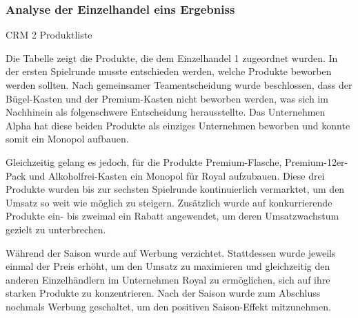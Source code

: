 \documentclass[a4paper,12pt]{article}
\begin{document}
\subsubsection{Analyse der Einzelhandel eins Ergebniss}
\begin{table}[H]
    \centering
    \caption{CRM 2 Produktliste}
    \label{tab:CRM 2 Produktliste}
\end{table}
Die Tabelle zeigt die Produkte, die dem Einzelhandel 1 zugeordnet wurden.
In der ersten Spielrunde musste entschieden werden, welche Produkte beworben werden sollten.
Nach gemeinsamer Teamentscheidung wurde beschlossen, dass der Bügel-Kasten und der Premium-Kasten nicht beworben werden,
was sich im Nachhinein als folgenschwere Entscheidung herausstellte.
Das Unternehmen Alpha hat diese beiden Produkte als einziges Unternehmen beworben und konnte somit ein Monopol aufbauen.

Gleichzeitig gelang es jedoch, für die Produkte Premium-Flasche,
Premium-12er-Pack und Alkoholfrei-Kasten ein Monopol für Royal aufzubauen.
Diese drei Produkte wurden bis zur sechsten Spielrunde kontinuierlich vermarktet,
um den Umsatz so weit wie möglich zu steigern.
Zusätzlich wurde auf konkurrierende Produkte ein- bis zweimal ein Rabatt angewendet,
um deren Umsatzwachstum gezielt zu unterbrechen.

Während der Saison wurde auf Werbung verzichtet.
Stattdessen wurde jeweils einmal der Preis erhöht,
um den Umsatz zu maximieren und gleichzeitig den anderen Einzelhändlern im Unternehmen Royal zu ermöglichen,
sich auf ihre starken Produkte zu konzentrieren.
Nach der Saison wurde zum Abschluss nochmals Werbung geschaltet, um den positiven Saison-Effekt mitzunehmen.
\end{document}
